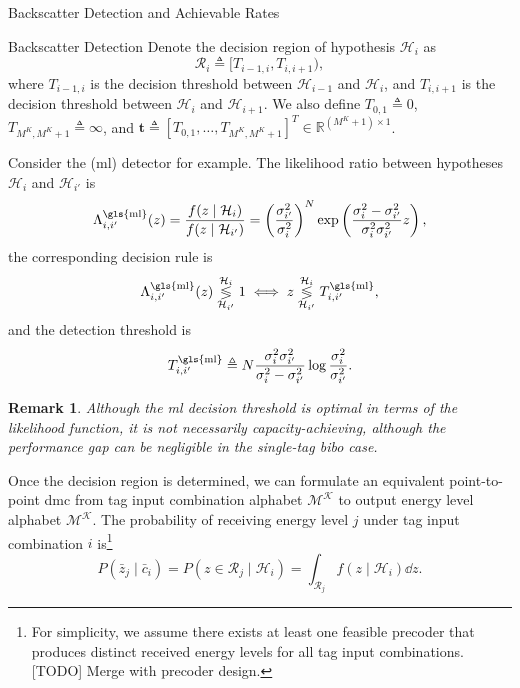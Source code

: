 \documentclass[journal]{IEEEtran}
\newtheorem{remark}{Remark}
\begin{document}
\begin{section}{Backscatter Detection and Achievable Rates}
\begin{subsection}{Backscatter Detection}
			Denote the decision region of hypothesis $\mathcal{H}_i$ as
			\begin{equation}
				\mathcal{R}_i \triangleq [T_{i-1,i}, T_{i,i+1}),
				\label{eq:decision_region}
			\end{equation}
			where $T_{i-1,i}$ is the decision threshold between $\mathcal{H}_{i-1}$ and $\mathcal{H}_i$, and $T_{i,i+1}$ is the decision threshold between $\mathcal{H}_i$ and $\mathcal{H}_{i+1}$. We also define $T_{0,1} \triangleq 0$, $T_{M^K,M^K+1} \triangleq \infty$, and $\boldsymbol{t} \triangleq [T_{0,1},\ldots,T_{M^K,M^K+1}]^T \in \mathbb{R}^{(M^K + 1) \times 1}$.

			Consider the (\gls{ml}) detector for example. The likelihood ratio between hypotheses $\mathcal{H}_i$ and $\mathcal{H}_{i'}$ is \cite{Qian2019}
			\begin{equation}
				\Lambda_{i,{i'}}^{\mathrm{\gls{ml}}}(z) = \frac{f(z \mid \mathcal{H}_i)}{f(z \mid \mathcal{H}_{i'})} = \left( \frac{\sigma_{i'}^2}{\sigma_i^2} \right)^N \exp \left( \frac{\sigma_i^2 - \sigma_{i'}^2}{\sigma_i^2 \sigma_{i'}^2} z \right),
				\label{eq:likelihood_ratio}
			\end{equation}
			the corresponding decision rule is
			\begin{equation}
				\Lambda_{i,{i'}}^{\mathrm{\gls{ml}}}(z) \underset{\mathcal{H}_{i'}}{\overset{\mathcal{H}_i}{\lessgtr}} 1 \iff z \underset{\mathcal{H}_{i'}}{\overset{\mathcal{H}_i}{\lessgtr}} T_{i,{i'}}^{\mathrm{\gls{ml}}},
				\label{eq:decision_rule}
			\end{equation}
			and the detection threshold is
			\begin{equation}
				T_{i,{i'}}^{\mathrm{\gls{ml}}} \triangleq N \frac{\sigma_i^2 \sigma_{i'}^2}{\sigma_i^2 - \sigma_{i'}^2} \log \frac{\sigma_i^2}{\sigma_{i'}^2}.
				\label{eq:detection_threshold}
			\end{equation}

			\begin{remark}
				Although the \gls{ml} decision threshold is optimal in terms of the likelihood function, it is not necessarily capacity-achieving, although the performance gap can be negligible in the single-tag \gls{bibo} case.
			\end{remark}

			Once the decision region is determined, we can formulate an equivalent point-to-point \gls{dmc} from tag input combination alphabet $\mathcal{M^K}$ to output energy level alphabet $\mathcal{M^K}$. The probability of receiving energy level $j$ under tag input combination $i$ is\footnote{For simplicity, we assume there exists at least one feasible precoder that produces distinct received energy levels for all tag input combinations. [TODO] Merge with precoder design.}
			\begin{equation}
				P(\bar{z}_j \mid \bar{c}_i) = P(z \in \mathcal{R}_j \mid \mathcal{H}_i) = \int_{\mathcal{R}_j} f(z \mid \mathcal{H}_i) \dd z.
				\label{eq:point_to_point_channel}
			\end{equation}


\end{subsection}
\end{section}
\end{document}

